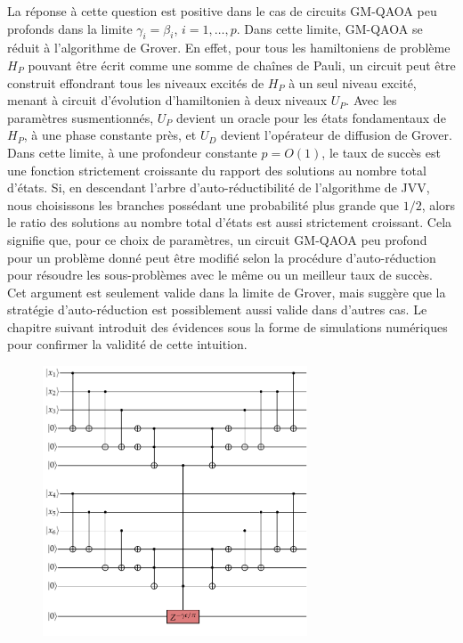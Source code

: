 La réponse à cette question est positive dans le cas de circuits GM-QAOA peu profonds dans la limite $\gamma_{i}=\beta_{i}$, $i=1,\dots,p$. Dans cette limite, GM-QAOA se réduit à l'algorithme de Grover. En effet, pour tous les hamiltoniens de problème $H_{P}$ pouvant être écrit comme une somme de chaînes de Pauli, un circuit peut être construit effondrant tous les niveaux excités de $H_{P}$ à un seul niveau excité, menant à circuit d'évolution d'hamiltonien à deux niveaux $U_{P}$. Avec les paramètres susmentionnés, $U_{P}$ devient un oracle pour les états fondamentaux de $H_{P}$, à une phase constante près, et $U_{D}$ devient l'opérateur de diffusion de Grover. Dans cette limite, à une profondeur constante $p=O(1)$, le taux de succès est une fonction strictement croissante du rapport des solutions au nombre total d'états. Si, en descendant l'arbre d'auto-réductibilité de l'algorithme de JVV, nous choisissons les branches possédant une probabilité plus grande que $1/2$, alors le ratio des solutions au nombre total d'états est aussi strictement croissant. Cela signifie que, pour ce choix de paramètres, un circuit GM-QAOA peu profond pour un problème donné peut être modifié selon la procédure d'auto-réduction pour résoudre les sous-problèmes avec le même ou un meilleur taux de succès. Cet argument est seulement valide dans la limite de Grover, mais suggère que la stratégie d'auto-réduction est possiblement aussi valide dans d'autres cas. Le chapitre suivant introduit des évidences sous la forme de simulations numériques pour confirmer la validité de cette intuition.

\begin{figure}[h]
    \centering
    \includegraphics[width=0.7\textwidth]{figures/tower-of-excited-states.pdf}
    \caption{}
    \label{fig:tower-of-excited-states}
\end{figure}

